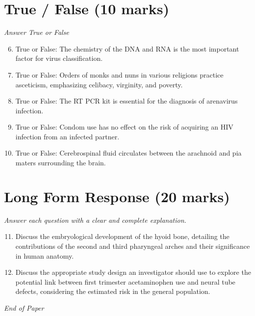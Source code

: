 \documentclass[12pt]{article}
\begin{document}
\section*{True / False (10 marks)}
\textit{Answer True or False}
\begin{enumerate}[label=\arabic*.]
\setcounter{enumi}{5}
\item True or False: The chemistry of the DNA and RNA is the most important factor for virus classification.
\item True or False: Orders of monks and nuns in various religions practice asceticism, emphasizing celibacy, virginity, and poverty.
\item True or False: The RT PCR kit is essential for the diagnosis of arenavirus infection.
\item True or False: Condom use has no effect on the risk of acquiring an HIV infection from an infected partner.
\item True or False: Cerebrospinal fluid circulates between the arachnoid and pia maters surrounding the brain.
\end{enumerate}

\section*{Long Form Response (20 marks)}
\textit{Answer each question with a clear and complete explanation.}
\begin{enumerate}[label=\arabic*.]
\setcounter{enumi}{10}
\item Discuss the embryological development of the hyoid bone, detailing the contributions of the second and third pharyngeal arches and their significance in human anatomy.
\item Discuss the appropriate study design an investigator should use to explore the potential link between first trimester acetaminophen use and neural tube defects, considering the estimated risk in the general population.
\end{enumerate}

\vfill
\noindent\textit{End of Paper}
\end{document}
